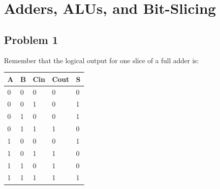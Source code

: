 \documentclass{article}
\begin{document}
\section*{Adders, ALUs, and Bit-Slicing}
\subsection*{Problem 1}
Remember that the logical output for one slice of a full adder is:
\begin{table}[!h]
\centering
\begin{tabular}{|l|l|l|l|l|}
\hline
\textbf{A} & \textbf{B} & \textbf{Cin} & \textbf{Cout} & \textbf{S} \\ \hline
0          & 0          & 0            & 0             & 0          \\ \hline
0          & 0          & 1            & 0             & 1          \\ \hline
0          & 1          & 0            & 0             & 1          \\ \hline
0          & 1          & 1            & 1             & 0          \\ \hline
1          & 0          & 0            & 0             & 1          \\ \hline
1          & 0          & 1            & 1             & 0          \\ \hline
1          & 1          & 0            & 1             & 0          \\ \hline
1          & 1          & 1            & 1             & 1          \\ \hline
\end{tabular}
\end{table}
\end{document}
